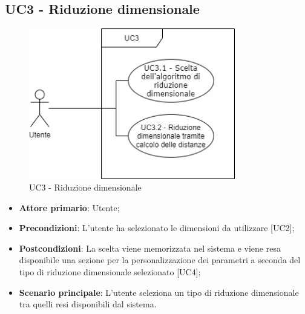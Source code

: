 \subsection{UC3 - Riduzione dimensionale}
\begin{figure}[h]
\includegraphics[width=9cm]{section/Images/UC3.png}
\centering
\caption{UC3 - Riduzione dimensionale}
\end{figure}
\begin{itemize}
	\item \textbf{Attore primario}: Utente;
	\item \textbf{Precondizioni}: L'utente ha selezionato le dimensioni da utilizzare [UC2];
	\item \textbf{Postcondizioni}: La scelta viene memorizzata nel sistema e viene resa disponibile una sezione per la personalizzazione dei parametri a seconda del tipo di riduzione dimensionale selezionato [UC4];
	\item \textbf{Scenario principale}: L'utente seleziona un tipo di riduzione dimensionale tra quelli resi disponibili dal sistema.
\end{itemize}